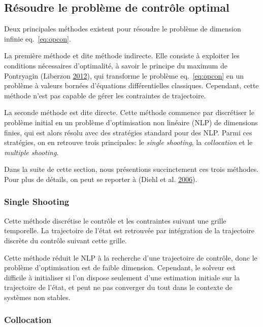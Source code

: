 \documentclass[french,A4paper,]{book}
\begin{document}
\subsection{Résoudre le problème de contrôle
optimal}\label{ruxe9soudre-le-probluxe8me-de-contruxf4le-optimal}

Deux principales méthodes existent pour résoudre le problème de
dimension infinie eq.~\ref{eq:opcon}.

La première méthode et dite méthode indirecte. Elle consiste à exploiter
les conditions nécessaires d'optimalité, à savoir le principe du maximum
de Pontryagin (Liberzon \protect\hyperlink{ref-liberzon12}{2012}), qui
transforme le problème eq.~\ref{eq:opcon} en un problème à valeurs
bornées d'équations différentielles classiques. Cependant, cette méthode
n'est pas capable de gérer les contraintes de trajectoire.

La seconde méthode est dite directe. Cette méthode commence par
discrétiser le problème initial en un problème d'optimisation non
linéaire (NLP) de dimensions finies, qui est alors résolu avec des
stratégies standard pour des NLP. Parmi ces stratégies, on en retrouve
trois principales: le \emph{single shooting}, la \emph{collocation} et
le \emph{multiple shooting}.

Dans la suite de cette section, nous présentions succinctement ces trois
méthodes. Pour plus de détails, on peut se reporter à (Diehl et al.
\protect\hyperlink{ref-FastMS}{2006}).

\subsubsection{Single Shooting}\label{single-shooting}

Cette méthode discrétise le contrôle et les contraintes suivant une
grille temporelle. La trajectoire de l'état est retrouvée par
intégration de la trajectoire discrète du contrôle suivant cette grille.

Cette méthode réduit le NLP à la recherche d'une trajectoire de
contrôle, donc le problème d'optimisation est de faible dimension.
Cependant, le solveur est difficile à initialiser si l'on dispose
seulement d'une estimation initiale sur la trajectoire de l'état, et
peut ne pas converger du tout dans le contexte de systèmes non stables.

\subsubsection{Collocation}\label{collocation}
\end{document}
